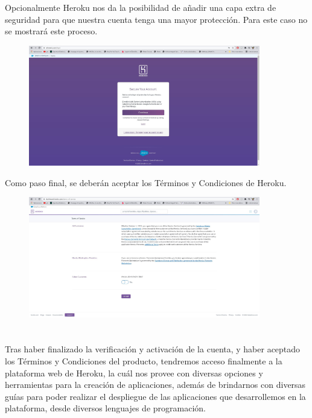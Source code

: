 \documentclass[10pt,a4paper]{article} %
\begin{document}
\begin{enumerate}
{			\pagebreak
			\item Opcionalmente Heroku nos da la posibilidad de a{\~n}adir una capa extra de seguridad para que nuestra cuenta tenga una mayor protecci{\'o}n. Para este caso no se mostrar{\'a} este proceso.
			\begin{figure}[H]
				\includegraphics[width=0.9\textwidth]{7.jpg}
				\centering
				\label{img:paso7}
			\end{figure}
			\item Como paso final, se deber{\'a}n aceptar los T{\'e}rminos y Condiciones de Heroku.
			\begin{figure}[H]
				\includegraphics[width=0.9\textwidth]{8.jpg}
				\centering
				\label{img:paso8}
			\end{figure}
		}
	\end{enumerate}
	
	\pagebreak
	
	\section{\color{colorIPN}{Resultados}}
	{\large Tras haber finalizado la verificaci{\'o}n y activaci{\'o}n de la cuenta, y haber aceptado los T{\'e}rminos y Condiciones del producto, tendremos acceso finalmente a la plataforma web de Heroku, la cu{\'a}l nos provee con diversas opciones y herramientas para la creaci{\'o}n de aplicaciones, adem{\'a}s de brindarnos con diversas gu{\'i}as para poder realizar el despliegue de las aplicaciones que desarrollemos en la plataforma, desde diversos lenguajes de programaci{\'o}n.}
	
\end{document}
